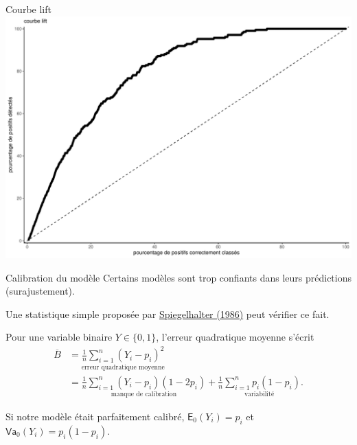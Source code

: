 \documentclass[
  ignorenonframetext,
]{beamer}
\begin{document}
\begin{frame}{Courbe lift}
\protect\hypertarget{courbe-lift-1}{}
\includegraphics{MATH60602-diapos6_files/figure-beamer/figcourbe-lift-pr-1.pdf}
\end{frame}

\begin{frame}{Calibration du modèle}
\protect\hypertarget{calibration-du-moduxe8le}{}
Certains modèles sont trop confiants dans leurs prédictions
(surajustement).

Une statistique simple proposée par
\href{https://doi.org/10.1002/sim.4780050506}{Spiegelhalter (1986)} peut
vérifier ce fait.

Pour une variable binaire \(Y \in \{0,1\}\), l'erreur quadratique
moyenne s'écrit \begin{align*}
\overline{B} &= \underset{\text{erreur quadratique moyenne}}{\frac{1}{n} \sum_{i=1}^n (Y_i-p_i)^2}
\\&=\underset{\text{manque de calibration}}{\frac{1}{n} \sum_{i=1}^n(Y_i-p_i)(1-2p_i)} + \underset{\text{variabilité}}{\frac{1}{n} \sum_{i=1}^n p_i(1-p_i)}.
\end{align*}

Si notre modèle était parfaitement calibré, \(\mathsf{E}_0(Y_i)=p_i\) et
\(\mathsf{Va}_0(Y_i) = p_i(1-p_i)\).
\end{frame}
\end{document}
